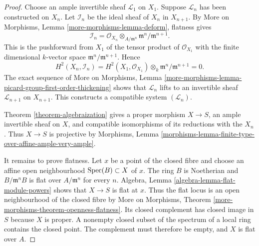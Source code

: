 \begin{proof}
Choose an ample invertible sheaf $\mathcal{L}_1$ on $X_1$. Suppose
$\mathcal{L}_n$ has been constructed on $X_n$. Let $\mathcal{I}_n$ be the
ideal sheaf of $X_n$ in $X_{n + 1}$. By More on Morphisms, Lemma
\ref{more-morphisms-lemma-deform}, flatness gives
$$
\mathcal{I}_n =
\mathcal{O}_{X_n} \otimes_{A/\mathfrak m^n}
\mathfrak m^n/\mathfrak m^{n + 1}.
$$
This is the pushforward from $X_1$ of the tensor product of
$\mathcal{O}_{X_1}$ with the finite dimensional $k$-vector space
$\mathfrak m^n/\mathfrak m^{n + 1}$. Hence
$$
H^2(X_n, \mathcal{I}_n) =
H^2(X_1, \mathcal{O}_{X_1}) \otimes_k
\mathfrak m^n/\mathfrak m^{n + 1} = 0.
$$
The exact sequence of More on Morphisms, Lemma
\ref{more-morphisms-lemma-picard-group-first-order-thickening} shows that
$\mathcal{L}_n$ lifts to an invertible sheaf $\mathcal{L}_{n + 1}$ on
$X_{n + 1}$. This constructs a compatible system $(\mathcal{L}_n)$.

Theorem \ref{theorem-algebraization} gives a proper morphism $X \to S$,
an ample invertible sheaf on $X$, and compatible isomorphisms of its
reductions with the $X_n$. Thus $X \to S$ is projective by Morphisms,
Lemma \ref{morphisms-lemma-finite-type-over-affine-ample-very-ample}.

It remains to prove flatness. Let $x$ be a point of the closed fibre and
choose an affine open neighbourhood $\mathop{\mathrm{Spec}}(B) \subset X$ of $x$. The ring
$B$ is Noetherian and $B/\mathfrak m^nB$ is flat over
$A/\mathfrak m^n$ for every $n$. Algebra, Lemma
\ref{algebra-lemma-flat-module-powers} shows that $X \to S$ is flat at
$x$. Thus the flat locus is an open neighbourhood of the closed fibre by
More on Morphisms, Theorem
\ref{more-morphisms-theorem-openness-flatness}. Its closed complement has
closed image in $S$ because $X$ is proper. A nonempty closed subset of the
spectrum of a local ring contains the closed point. The complement must
therefore be empty, and $X$ is flat over $A$.
\end{proof}
























